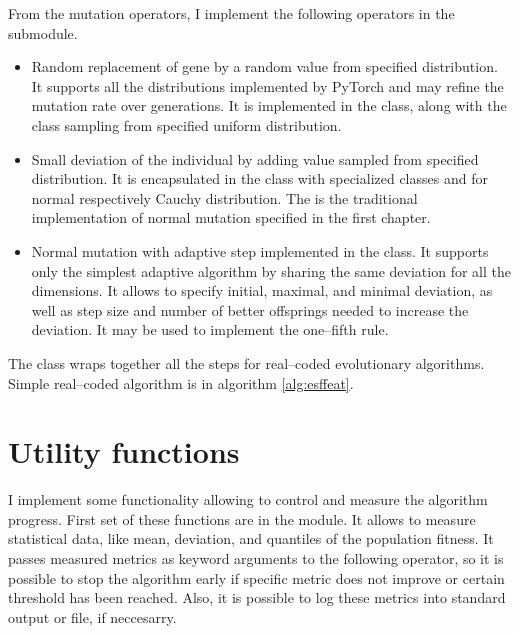 From the mutation operators, I implement the following operators in the  submodule.
\begin{itemize}
    \item Random replacement of gene by a random value from specified distribution. It supports all the distributions implemented by PyTorch \citep{PyTorchDoc} and may refine the mutation rate over generations. It is implemented in the  class, along with the  class sampling from specified uniform distribution.
    \item Small deviation of the individual by adding value sampled from specified distribution. It is encapsulated in the  class with specialized classes  and  for normal respectively Cauchy distribution. The  is the traditional implementation of normal mutation specified in the first chapter.
    \item Normal mutation with adaptive step implemented in the  class. It supports only the simplest adaptive algorithm by sharing the same deviation for all the dimensions. It allows to specify initial, maximal, and minimal deviation, as well as step size and number of better offsprings needed to increase the deviation. It may be used to implement the one--fifth rule.
\end{itemize}

The  class wraps together all the steps for real--coded evolutionary algorithms. Simple real--coded algorithm is in algorithm \ref{alg:esffeat}.
    



\section{Utility functions}

I implement some functionality allowing to control and measure the algorithm progress. First set of these functions are in the  module. It allows to measure statistical data, like mean, deviation, and quantiles of the population fitness. It passes measured metrics as keyword arguments to the following operator, so it is possible to stop the algorithm early if specific metric does not improve or certain threshold has been reached. Also, it is possible to log these metrics into standard output or file, if neccesarry.

